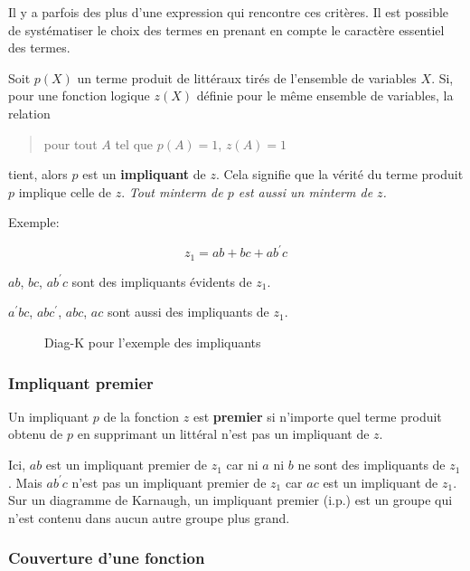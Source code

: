 \documentclass[11pt]{article}
\begin{document}
Il y a parfois des plus d'une expression qui rencontre ces
critères. Il est possible de systématiser le choix des termes en
prenant en compte le caractère essentiel des termes.

Soit \(p(X)\) un terme produit de littéraux tirés de l'ensemble de
variables \(X\). Si, pour une fonction logique \(z(X)\) définie pour le
même ensemble de variables, la relation

\begin{quote}
pour tout \(A\) tel que \(p(A)=1\), \(z(A)=1\)
\end{quote}

tient, alors \(p\) est un \textbf{impliquant} de \(z\). Cela signifie que la
vérité du terme produit \(p\) implique celle de \(z\). \emph{Tout minterm de
\(p\) est aussi un minterm de \(z\).}

Exemple:

$$z_1 = ab + bc + a b^{\prime} c$$ 

\(a b\), \(b c\), \(a b^{\prime} c\) sont des impliquants évidents de \(z_1\).

\(a^{\prime} b c\), \(a b c^{\prime}\), \(a b c\), \(a c\) sont aussi des
impliquants de \(z_1\).

\begin{figure}[htbp]
\centering

\caption{\label{fig:org1b2bd37}Diag-K pour l'exemple des impliquants}
\end{figure}

\subsubsection{Impliquant premier}
\label{sec:org608d484}

Un impliquant \(p\) de la fonction \(z\) est \textbf{premier} si n'importe quel
terme produit obtenu de \(p\) en supprimant un littéral n'est pas un
impliquant de \(z\).

Ici, \(a b\) est un impliquant premier de \(z_1\) car ni \(a\) ni \(b\) ne
sont des impliquants de \(z_1\). Mais \(a b^{\prime} c\) n'est pas un
impliquant premier de \(z_1\) car \(a c\) est un impliquant de \(z_1\).
Sur un diagramme de Karnaugh, un impliquant premier (i.p.) est un
groupe qui n'est contenu dans aucun autre groupe plus grand.

\subsubsection{Couverture d'une fonction}
\label{sec:org8df51ae}
\end{document}
